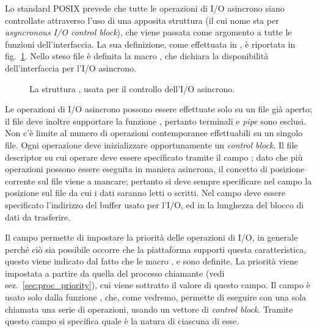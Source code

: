 Lo standard POSIX prevede che tutte le operazioni di I/O asincrono siano
controllate attraverso l'uso di una apposita struttura  (il cui
nome sta per \textit{asyncronous I/O control block}), che viene passata come
argomento a tutte le funzioni dell'interfaccia. La sua definizione, come
effettuata in , è riportata in
fig.~\ref{fig:file_aiocb}. Nello steso file è definita la macro
, che dichiara la disponibilità
dell'interfaccia per l'I/O asincrono.

\begin{figure}[!htb]
  \footnotesize \centering
  \begin{minipage}[c]{0.90\textwidth}
  \end{minipage}
  \normalsize 
  \caption{La struttura , usata per il controllo dell'I/O
    asincrono.}
  \label{fig:file_aiocb}
\end{figure}

Le operazioni di I/O asincrono possono essere effettuate solo su un file già
aperto; il file deve inoltre supportare la funzione , pertanto
terminali e \textit{pipe} sono esclusi. Non c'è limite al numero di operazioni
contemporanee effettuabili su un singolo file.  Ogni operazione deve
inizializzare opportunamente un \textit{control block}.  Il file descriptor su
cui operare deve essere specificato tramite il campo ; dato
che più operazioni possono essere eseguita in maniera asincrona, il concetto
di posizione corrente sul file viene a mancare; pertanto si deve sempre
specificare nel campo  la posizione sul file da cui i dati
saranno letti o scritti.  Nel campo  deve essere specificato
l'indirizzo del buffer usato per l'I/O, ed in  la lunghezza
del blocco di dati da trasferire.

Il campo  permette di impostare la priorità delle operazioni
di I/O, in generale perché ciò sia possibile occorre che la piattaforma
supporti questa caratteristica, questo viene indicato dal fatto che le macro
, e 
sono definite. La priorità viene impostata a partire da quella del processo
chiamante (vedi sez.~\ref{sec:proc_priority}), cui viene sottratto il valore
di questo campo.  Il campo  è usato solo dalla funzione
, che, come vedremo, permette di eseguire con una sola
chiamata una serie di operazioni, usando un vettore di \textit{control
  block}. Tramite questo campo si specifica quale è la natura di ciascuna di
esse.

